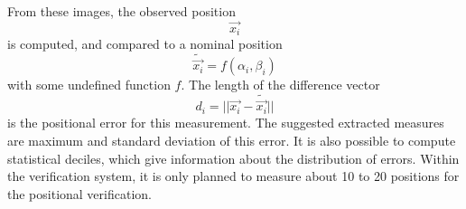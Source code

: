 \documentclass[11pt,a4paper]{scrartcl}
\begin{document}
From these images, the observed position
\[
\vec{x_i}
\]
is computed, and compared to a nominal position
\[
\tilde{\vec{x_i}} = f(\alpha_i,\beta_i)
\]
with some undefined function $f$.
The length of the difference vector
\[
d_i = || \vec{x_i} - \tilde{\vec{x_i}}||
\]
is the positional error for this measurement.  The suggested extracted
measures are maximum and standard deviation of this error. It is also
possible to compute statistical deciles, which give information about
the distribution of errors. Within the verification system, it is only
planned to measure about 10 to 20 positions for the positional verification.

\begin{eqnarray}
\end{eqnarray}
\end{document}
